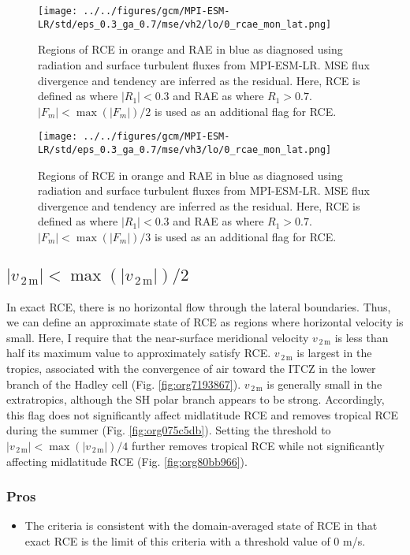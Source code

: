 \documentclass[11pt]{article}
\begin{document}
\begin{figure}[!h]
\centering
\texttt{[image: ../../figures/gcm/MPI-ESM-LR/std/eps\_0.3\_ga\_0.7/mse/vh2/lo/0\_rcae\_mon\_lat.png]}
\caption{\label{fig:orgdb46e7a}Regions of RCE in orange and RAE in blue as diagnosed using radiation and surface turbulent fluxes from MPI-ESM-LR. MSE flux divergence and tendency are inferred as the residual. Here, RCE is defined as where \(|R_1| < 0.3\) and RAE as where \(R_1 > 0.7\). \(|F_m|<\max(|F_m|)/2\) is used as an additional flag for RCE.}
\end{figure}

\begin{figure}[!h]
\centering
\texttt{[image: ../../figures/gcm/MPI-ESM-LR/std/eps\_0.3\_ga\_0.7/mse/vh3/lo/0\_rcae\_mon\_lat.png]}
\caption{\label{fig:org5617d48}Regions of RCE in orange and RAE in blue as diagnosed using radiation and surface turbulent fluxes from MPI-ESM-LR. MSE flux divergence and tendency are inferred as the residual. Here, RCE is defined as where \(|R_1| < 0.3\) and RAE as where \(R_1 > 0.7\). \(|F_m|<\max(|F_m|)/3\) is used as an additional flag for RCE.}
\end{figure}

\clearpage
\subsection{\(|v_{\,\mathrm{2\,m}}|<\max(|v_{\,\mathrm{2\,m}}|)/2\)}
\label{sec:org8bd0b2a}
In exact RCE, there is no horizontal flow through the lateral boundaries. Thus, we can define an approximate state of RCE as regions where horizontal velocity is small. Here, I require that the near-surface meridional velocity \(v_{\,\mathrm{2\,m}}\) is less than half its maximum value to approximately satisfy RCE. \(v_{\,\mathrm{2\,m}}\) is largest in the tropics, associated with the convergence of air toward the ITCZ in the lower branch of the Hadley cell (Fig. \ref{fig:org7193867}). \(v_{\,\mathrm{2\,m}}\) is generally small in the extratropics, although the SH polar branch appears to be strong. Accordingly, this flag does not significantly affect midlatitude RCE and removes tropical RCE during the summer (Fig. \ref{fig:org075c5db}). Setting the threshold to \(|v_{\,\mathrm{2\,m}}|<\max(|v_{\,\mathrm{2\,m}}|)/4\) further removes tropical RCE while not significantly affecting midlatitude RCE (Fig. \ref{fig:org80bb966}).

\subsubsection*{Pros}
\label{sec:org5fe1813}
\begin{itemize}
\item The criteria is consistent with the domain-averaged state of RCE in that exact RCE is the limit of this criteria with a threshold value of 0 m/s.
\end{itemize}
\end{document}
